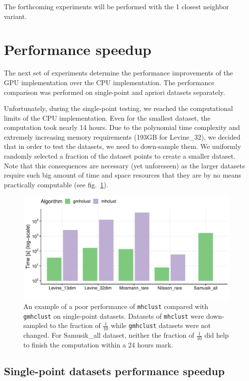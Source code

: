 The forthcoming experiments will be performed with the 1 closest neighbor variant.

\section{Performance speedup}

The next set of experiments determine the performance improvements of the GPU implementation over the CPU implementation. The performance comparison was performed on single-point and apriori datasets separately.

Unfortunately, during the single-point testing, we reached the computational limits of the CPU implementation. Even for the smallest dataset, the computation took nearly 14 hours. Due to the polynomial time complexity and extremely increasing memory requirements (193GB for Levine\_32), we decided that in order to test the datasets, we need to down-sample them. We uniformly randomly selected a fraction of the dataset points to create a smaller dataset. Note that this consequences are necessary (yet unforeseen) as the larger datasets require such big amount of time and space resources that they are by no means practically computable (see fig.~\ref{fig04:fract_comp}).

\begin{figure}\centering
	\includegraphics[width=\linewidth]{img/mixed_perf_comp}
	\caption{An example of a poor performance of \texttt{mhclust} compared with \texttt{gmhclust} on single-point datasets. Datasets of \texttt{mhclust} were down-sampled to the fraction of $\frac{1}{10}$ while \texttt{gmhclust} datasets were not changed. For Samusik\_all dataset, neither the fraction of $\frac{1}{10}$ did help to finish the computation within a 24 hours mark.}
	\label{fig04:fract_comp}
\end{figure}

\subsection{Single-point datasets performance speedup}


